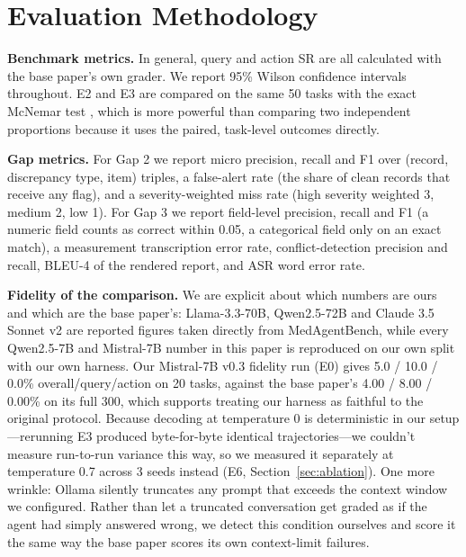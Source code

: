 \documentclass[conference]{IEEEtran}
\begin{document}
\section{Evaluation Methodology}\label{sec:eval}

\textbf{Benchmark metrics.} In general, query and action SR are all calculated with the base paper's own grader. We report 95\% Wilson confidence intervals throughout. E2 and E3 are compared on the same 50 tasks with the exact McNemar test \cite{mcnemar1947}, which is more powerful than comparing two independent proportions because it uses the paired, task-level outcomes directly.

\textbf{Gap metrics.} For Gap 2 we report micro precision, recall and F1 over (record, discrepancy type, item) triples, a false-alert rate (the share of clean records that receive any flag), and a severity-weighted miss rate (high severity weighted 3, medium 2, low 1). For Gap 3 we report field-level precision, recall and F1 (a numeric field counts as correct within 0.05, a categorical field only on an exact match), a measurement transcription error rate, conflict-detection precision and recall, BLEU-4 of the rendered report, and ASR word error rate.

\textbf{Fidelity of the comparison.} We are explicit about which numbers are ours and which are the base paper's: Llama-3.3-70B, Qwen2.5-72B and Claude 3.5 Sonnet v2 are reported figures taken directly from MedAgentBench, while every Qwen2.5-7B and Mistral-7B number in this paper is reproduced on our own split with our own harness. Our Mistral-7B v0.3 fidelity run (E0) gives 5.0 / 10.0 / 0.0\% overall/query/action on 20 tasks, against the base paper's 4.00 / 8.00 / 0.00\% on its full 300, which supports treating our harness as faithful to the original protocol. Because decoding at temperature 0 is deterministic in our setup---rerunning E3 produced byte-for-byte identical trajectories---we couldn't measure run-to-run variance this way, so we measured it separately at temperature 0.7 across 3 seeds instead (E6, Section~\ref{sec:ablation}). One more wrinkle: Ollama silently truncates any prompt that exceeds the context window we configured. Rather than let a truncated conversation get graded as if the agent had simply answered wrong, we detect this condition ourselves and score it the same way the base paper scores its own context-limit failures.
\end{document}
